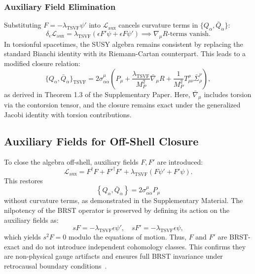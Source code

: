 \documentclass[twocolumn,superscriptaddress,floatfix]{revtex4-2}
\begin{document}
\subsubsection{Auxiliary Field Elimination}  
Substituting $F = -\lambda_{\text{TSVF}} \psi'$ into $\mathcal{L}_{\text{aux}}$ cancels curvature terms in $\{Q_\alpha, \bar{Q}_{\dot{\alpha}}\}$:  
\begin{equation}  
\delta_{\epsilon} \mathcal{L}_{\text{aux}} = \lambda_{\text{TSVF}} \left( \epsilon F' \psi + \epsilon F \psi' \right) \implies \nabla_\mu R \text{-terms vanish}.  
\label{eq:aux_terms_vanish}
\end{equation}
In torsionful spacetimes, the SUSY algebra remains consistent by replacing the standard Bianchi identity with its Riemann-Cartan counterpart. This leads to a modified closure relation:
\[
\{Q_\alpha, \bar{Q}_{\dot{\alpha}}\}_{\text{TSVF}} = 2 \sigma^\mu_{\alpha \dot{\alpha}} \left( P_\mu + \frac{\lambda_{\text{TSVF}}}{M_P^2} \bar{\nabla}_\mu R + \frac{1}{M_P^2} T^\rho_{\mu\nu} \bar{\Sigma}^\nu_\rho \right),
\]
as derived in Theorem 1.3 of the Supplementary Paper. Here, $\bar{\nabla}_\mu$ includes torsion via the contorsion tensor, and the closure remains exact under the generalized Jacobi identity with torsion contributions.

\subsection{Auxiliary Fields for Off-Shell Closure}  
\label{subsec:auxiliary}    

To close the algebra off-shell, auxiliary fields $F, F'$ are introduced:  
\begin{equation}  
\mathcal{L}_{\text{aux}} = F^\dagger F + F'^\dagger F' + \lambda_{\text{TSVF}}(F\psi' + F'\psi).  
\label{eq:auxiliary}   
\end{equation}  
This restores  
\[
\left\{ Q_{\alpha}, \bar{Q}_{\dot{\alpha}} \right\} = 2\sigma^{\mu}_{\alpha\dot{\alpha}}P_{\mu}
\]
without curvature terms, as demonstrated in the Supplementary Material.
The nilpotency of the BRST operator is preserved by defining its action on the auxiliary fields as:
\[
sF = -\lambda_{\text{TSVF}} \epsilon \psi', \quad sF' = -\lambda_{\text{TSVF}} \epsilon \psi,
\]
which yields $s^2 F = 0$ modulo the equations of motion. Thus, $F$ and $F'$ are BRST-exact and do not introduce independent cohomology classes. This confirms they are non-physical gauge artifacts and ensures full BRST invariance under retrocausal boundary conditions~\cite{Henneaux1992}.
\end{document}
